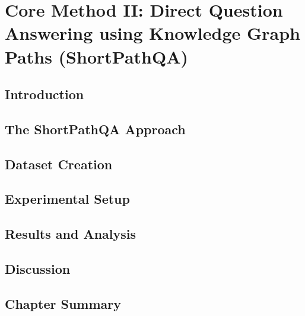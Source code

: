 \chapter{Core Method II: Direct Question Answering using Knowledge Graph Paths (ShortPathQA)}
\label{ch:shortpathqa}

\section{Introduction}
\label{sec:shortpath:intro}

\section{The ShortPathQA Approach}
\label{sec:shortpath:method}

\section{Dataset Creation}
\label{sec:shortpath:dataset}

\section{Experimental Setup}
\label{sec:shortpath:setup}

\section{Results and Analysis}
\label{sec:shortpath:results}

\section{Discussion}
\label{sec:shortpath:discussion}

\section{Chapter Summary}
\label{sec:shortpath:summary}
